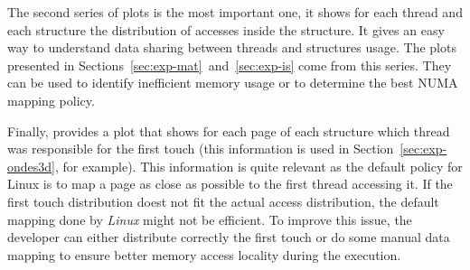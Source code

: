 The second series of plots is the most important one, it shows for
each thread and each structure the distribution of accesses inside the
structure. It gives an easy way to understand data sharing between threads and
structures usage. The plots presented in Sections~\ref{sec:exp-mat}~and~\ref{sec:exp-is} come from this series. They can be used to identify inefficient memory usage or to determine the best NUMA mapping
policy.

Finally, \TABARNAC provides a plot that shows for each page of each structure
which thread was responsible for the first touch (this information is used in Section~\ref{sec:exp-ondes3d}, for example). This information is quite relevant as the default
policy for Linux is to map a page as close as possible to the first thread
accessing it. If the first touch distribution doest not fit the actual access
distribution, the default mapping done by \emph{Linux} might not be efficient.
To improve this issue, the developer can either distribute correctly the first touch or do some
manual data mapping to ensure better memory access locality during the execution.

